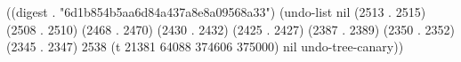 
((digest . "6d1b854b5aa6d84a437a8e8a09568a33") (undo-list nil (2513 . 2515) (2508 . 2510) (2468 . 2470) (2430 . 2432) (2425 . 2427) (2387 . 2389) (2350 . 2352) (2345 . 2347) 2538 (t 21381 64088 374606 375000) nil undo-tree-canary))
